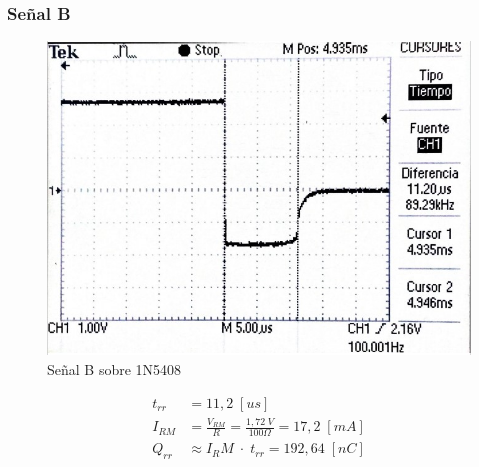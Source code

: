 \documentclass{article}
\begin{document}
\subsubsection{Señal B}
\begin{figure}[h!]
 \begin{center}
	\includegraphics[scale=0.5]{imagenes/1N5408_B.jpg} 
	\caption{Señal B sobre 1N5408}
 \end{center}
\end{figure}
%
\begin{align*}
	t_{rr} &= 11,2 \; [us] \\
	I_{RM}	&= \frac{V_{RM}}{R} = \frac{1,72 \; V}{100 \Omega} = 17,2 \; [mA]\\
	Q_{rr}	&\approx {I_RM} \; \cdot \; t_{rr} = 192,64 \; [nC]
\end{align*}
%
\end{document}
